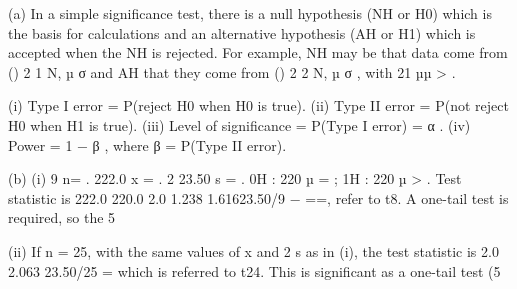 \documentclass[a4paper,12pt]{article}
\begin{document}
 
 
(a) In a simple significance test, there is a null hypothesis (NH or H0) which is the basis for calculations and an alternative hypothesis (AH or H1) which is accepted when the NH is rejected.  For example, NH may be that data come from () 2 1 N, µ σ
 and AH that they come from () 2 2 N, µ σ , with 21 µµ > . 
 
 
 
 
 
 
 
 
 
 
 
 
 
(i) Type I error = P(reject H0 when H0 is true). 
 (ii) Type II error = P(not reject H0 when H1 is true). 
 (iii) Level of significance = P(Type I error) = α . 
 (iv) Power = 1 − β , where β = P(Type II error). 
 
 
(b) (i) 9 n= .   222.0 x = .   2 23.50 s = .   0H : 220 µ = ;   1H : 220 µ > .  Test statistic is 222.0 220.0 2.0 1.238 1.61623.50/9 − ==, refer to t8. 
 A one-tail test is required, so the 5%
 
(ii) If n = 25, with the same values of x and 2 s as in (i), the test statistic is 2.0 2.063 23.50/25 = which is referred to t24.  This is significant as a one-tail test (5%
\end{document}
